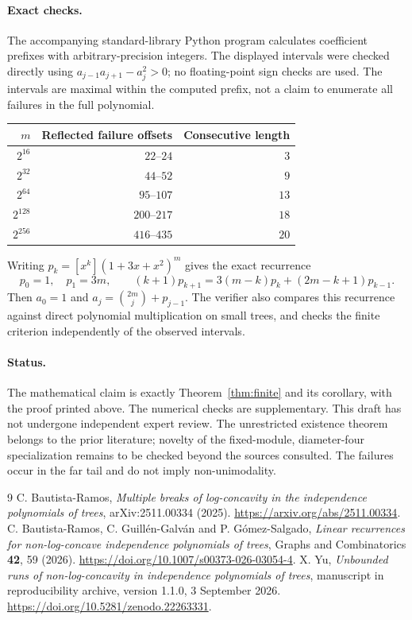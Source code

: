 \documentclass[11pt]{article}
\newcommand{\coef}[2]{[x^{#1}]#2}
\begin{document}
\paragraph{Exact checks.}
The accompanying standard-library Python program calculates coefficient
prefixes with arbitrary-precision integers. The displayed intervals were
checked directly using $a_{j-1}a_{j+1}-a_j^2>0$; no floating-point sign
checks are used. The intervals are maximal within the computed prefix,
not a claim to enumerate all failures in the full polynomial.
\begin{center}
\begin{tabular}{@{}rrr@{}}
\toprule
$m$ & Reflected failure offsets & Consecutive length\\
\midrule
$2^{16}$ & $22$--$24$ & $3$\\
$2^{32}$ & $44$--$52$ & $9$\\
$2^{64}$ & $95$--$107$ & $13$\\
$2^{128}$ & $200$--$217$ & $18$\\
$2^{256}$ & $416$--$435$ & $20$\\
\bottomrule
\end{tabular}
\end{center}
Writing $p_k=\coef{k}{(1+3x+x^2)^m}$ gives the exact recurrence
\[
 p_0=1,\quad p_1=3m,\qquad
 (k+1)p_{k+1}=3(m-k)p_k+(2m-k+1)p_{k-1}.
\]
Then $a_0=1$ and $a_j=\binom{2m}{j}+p_{j-1}$. The verifier also compares
this recurrence against direct polynomial multiplication on small trees,
and checks the finite criterion independently of the observed intervals.

\paragraph{Status.}
The mathematical claim is exactly Theorem~\ref{thm:finite} and its
corollary, with the proof printed above. The numerical checks are
supplementary. This draft has not undergone independent expert review.
The unrestricted existence theorem belongs to the prior literature;
novelty of the fixed-module, diameter-four specialization remains to be
checked beyond the sources consulted. The failures occur in the far tail
and do not imply non-unimodality.

\begin{thebibliography}{9}\small
{} C. Bautista-Ramos,
\emph{Multiple breaks of log-concavity in the independence polynomials of trees},
arXiv:2511.00334 (2025).
\url{https://arxiv.org/abs/2511.00334}.
 C. Bautista-Ramos, C. Guill\'en-Galv\'an and P. G\'omez-Salgado,
\emph{Linear recurrences for non-log-concave independence polynomials of trees},
Graphs and Combinatorics \textbf{42}, 59 (2026).
\url{https://doi.org/10.1007/s00373-026-03054-4}.
 X. Yu,
\emph{Unbounded runs of non-log-concavity in independence polynomials of trees},
manuscript in reproducibility archive, version 1.1.0, 3 September 2026.
\url{https://doi.org/10.5281/zenodo.22263331}.
\end{thebibliography}
\end{document}

